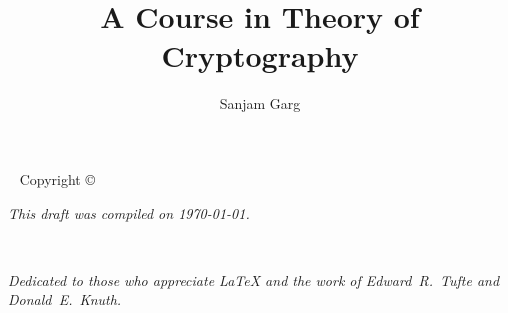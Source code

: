\documentclass[12pt]{tufte-book}
\title{A Course in Theory of Cryptography}
\author[Sanjam Garg]{Sanjam Garg}
\newcommand{\openepigraph}[2]{%
  \begin{fullwidth}
  \sffamily\large
  \begin{doublespace}
  \noindent\allcaps{#1}\\%
  \noindent\allcaps{#2}%
  \end{doublespace}
  \end{fullwidth}
}
\newcommand{\blankpage}{\newpage\hbox{}\thispagestyle{empty}\newpage}
\begin{document}

\maketitle


\begin{fullwidth}
~\vfill
\thispagestyle{empty}
\setlength{\parindent}{0pt}
\setlength{\parskip}{\baselineskip}
Copyright \copyright\ \the\year\ \thanklessauthor


\par{}


\par \doclicenseThis

\par\textit{This draft was compiled on \today.}
\end{fullwidth}

\tableofcontents



\iffalse
\cleardoublepage
~\vfill

\begin{doublespace}
\noindent\fontsize{18}{22}\selectfont\itshape
\nohyphenation
Dedicated to those who appreciate \LaTeX{} 
and the work of \mbox{Edward R.~Tufte} 
and \mbox{Donald E.~Knuth}.
\end{doublespace}
\vfill
\vfill
\end{document}
